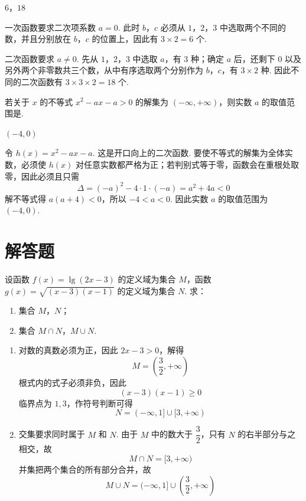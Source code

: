 \begin{answer}
\(6\)，\(18\)
\end{answer}

\begin{solution}
一次函数要求二次项系数 \(a=0\). 此时 \(b\)，\(c\) 必须从 \(1\)，\(2\)，\(3\) 中选取两个不同的数，并且分别放在 \(b\)，\(c\) 的位置上，因此有 \(3\times2=6\) 个.

二次函数要求 \(a\ne0\). 先从 \(1\)，\(2\)，\(3\) 中选取 \(a\)，有 \(3\) 种；确定 \(a\) 后，还剩下 \(0\) 以及另外两个非零数共三个数，从中有序选取两个分别作为 \(b\)，\(c\)，有 \(3\times2\) 种. 因此不同的二次函数有 \(3\times3\times2=18\) 个.
\end{solution}

\begin{problem}
若关于 \(x\) 的不等式 \(x^2-ax-a>0\) 的解集为 \((-\infty,+\infty)\)，则实数 \(a\) 的取值范围是\fillinblank{}.
\end{problem}

\begin{answer}
\((-4,0)\)
\end{answer}

\begin{solution}
令 \(h(x)=x^2-ax-a\). 这是开口向上的二次函数. 要使不等式的解集为全体实数，必须使 \(h(x)\) 对任意实数都严格为正；若判别式等于零，函数会在重根处取零，因此必须且只需
\[
\Delta=(-a)^2-4\cdot1\cdot(-a)=a^2+4a<0
\]
解不等式得 \(a(a+4)<0\)，所以 \(-4<a<0\). 因此实数 \(a\) 的取值范围为 \((-4,0)\).
\end{solution}

\section{解答题}
\begin{problem}
设函数 \(f(x)=\lg(2x-3)\) 的定义域为集合 \(M\)，函数 \(g(x)=\sqrt{(x-3)(x-1)}\) 的定义域为集合 \(N\). 求：

\begin{enumerate}
\item 集合 \(M\)，\(N\)；
\item 集合 \(M\cap N\)，\(M\cup N\).
\end{enumerate}
\end{problem}

\begin{solution}
\begin{enumerate}
\item 对数的真数必须为正，因此 \(2x-3>0\)，解得
\[
M=\left(\frac32,+\infty\right)
\]
根式内的式子必须非负，因此
\[
(x-3)(x-1)\geq0
\]
临界点为 \(1,3\)，作符号判断可得
\[
N=(-\infty,1]\cup[3,+\infty)
\]
\item 交集要求同时属于 \(M\) 和 \(N\). 由于 \(M\) 中的数大于 \(\dfrac32\)，只有 \(N\) 的右半部分与之相交，故
\[
M\cap N=[3,+\infty)
\]
并集把两个集合的所有部分合并，故
\[
M\cup N=(-\infty,1]\cup\left(\frac32,+\infty\right)
\]
\end{enumerate}
\end{solution}

